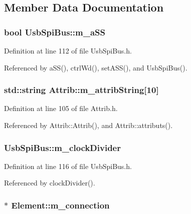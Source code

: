 \subsection{Member Data Documentation}
\hypertarget{classUsbSpiBus_ac98d088ac8aed042f65cbd918fc538ae}{
\subsubsection[{m\_\-aSS}]{\setlength{\rightskip}{0pt plus 5cm}bool {\bf UsbSpiBus::m\_\-aSS}}}
\label{classUsbSpiBus_ac98d088ac8aed042f65cbd918fc538ae}


Definition at line 112 of file UsbSpiBus.h.

Referenced by aSS(), ctrlWd(), setASS(), and UsbSpiBus().\hypertarget{classAttrib_a3414521d7a82476e874b25a5407b5e63}{
\subsubsection[{m\_\-attribString}]{\setlength{\rightskip}{0pt plus 5cm}std::string {\bf Attrib::m\_\-attribString}\mbox{[}10\mbox{]}}}
\label{classAttrib_a3414521d7a82476e874b25a5407b5e63}


Definition at line 105 of file Attrib.h.

Referenced by Attrib::Attrib(), and Attrib::attributs().\hypertarget{classUsbSpiBus_a5a4de2b61018f52b885559ce07bd3161}{
\subsubsection[{m\_\-clockDivider}]{ {\bf UsbSpiBus::m\_\-clockDivider}}}
\label{classUsbSpiBus_a5a4de2b61018f52b885559ce07bd3161}


Definition at line 116 of file UsbSpiBus.h.

Referenced by clockDivider().\hypertarget{classElement_abe3de7a5dbbc9a6dd2d7e012e5fdb266}{
\subsubsection[{m\_\-connection}]{$\ast$ {\bf Element::m\_\-connection}}}
\label{classElement_abe3de7a5dbbc9a6dd2d7e012e5fdb266}


